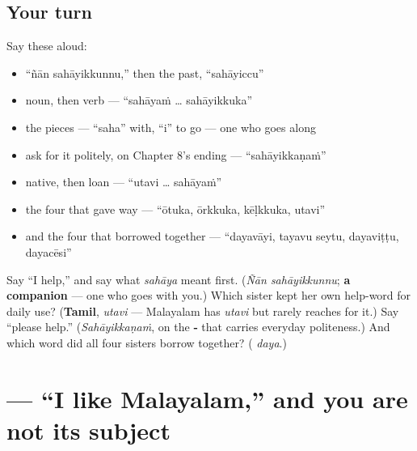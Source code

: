 \subsection*{Your turn}
Say these aloud:

\begin{itemize}
\raggedright
  \item \textquotedblleft{}ñān sahāyikkunnu,\textquotedblright{} then the past, \textquotedblleft{}sahāyiccu\textquotedblright{}
  \item noun, then verb — \textquotedblleft{}sahāyaṁ … sahāyikkuka\textquotedblright{}
  \item the pieces — \textquotedblleft{}saha\textquotedblright{} with, \textquotedblleft{}i\textquotedblright{} to go — one who goes along
  \item ask for it politely, on Chapter 8's ending — \textquotedblleft{}sahāyikkaṇaṁ\textquotedblright{}
  \item native, then loan — \textquotedblleft{}utavi … sahāyaṁ\textquotedblright{}
  \item the four that gave way — \textquotedblleft{}ōtuka, ōrkkuka, kēḷkkuka, utavi\textquotedblright{}
  \item and the four that borrowed together — \textquotedblleft{}dayavāyi, tayavu seytu, dayaviṭṭu, dayacēsi\textquotedblright{}
\end{itemize}

\begin{tcolorbox}[breakable,colback=teal!4,colframe=teal!35!black,title={Before you move on}]
Say \textquotedblleft{}I help,\textquotedblright{} and say what \emph{sahāya} meant first. (\emph{Ñān sahāyikkunnu}; \textbf{a companion} — one who goes with you.) Which sister kept her own help-word for daily use? (\textbf{Tamil}, \emph{utavi} — Malayalam has \emph{utavi} but rarely reaches for it.) Say \textquotedblleft{}please help.\textquotedblright{} (\emph{Sahāyikkaṇaṁ}, on the \textbf{‑} that carries everyday politeness.) And which word did all four sisters borrow together? (\textbf{} \emph{daya}.)
\end{tcolorbox}
\section[\texorpdfstring{\ml{എനിക്ക്} \ml{മലയാളം} … (enikkŭ malayāḷaṁ …)}{എനിക്ക് മലയാളം … (enikkŭ malayāḷaṁ …)}]{   — \textquotedblleft{}I like Malayalam,\textquotedblright{} and you are not its subject}


